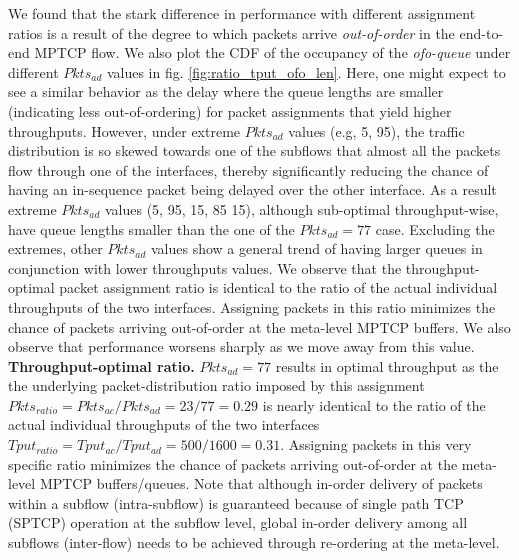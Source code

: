 We found that the stark difference in performance with different %
assignment ratios is a result of the degree to which packets arrive
\textit{out-of-order} in the end-to-end MPTCP flow. 
\fi
We also plot the CDF of the
occupancy of the \emph{ofo-queue} under different $Pkts_{ad}$
values in fig. \ref{fig:ratio_tput_ofo_len}. Here, one might expect to
see a similar behavior as the delay where the queue lengths are smaller
(indicating less out-of-ordering) for packet assignments that yield
higher throughputs. However, under extreme $Pkts_{ad}$ values
(e.g, 5, 95), the traffic distribution is so skewed towards one of
the subflows that almost all the packets flow through one of
the interfaces, thereby significantly reducing the chance of having an
in-sequence packet being delayed over the other interface. As a result
extreme $Pkts_{ad}$ values (5, 95, 15, 85 15), although sub-optimal
throughput-wise, have queue lengths smaller than the one of the $Pkts_{ad}=77$ case.
Excluding the extremes, other $Pkts_{ad}$ values show a general trend of
having larger queues in conjunction with lower throughputs values.
\fi
We observe that the throughput-optimal packet assignment ratio is
identical to the ratio of the actual individual throughputs of the two
interfaces. Assigning packets in this ratio minimizes the chance of
packets arriving out-of-order at the meta-level MPTCP buffers. We also
observe that performance worsens sharply as we move away from this
value.
\noindent\textbf{Throughput-optimal ratio.} $Pkts_{ad}=77$ results in optimal throughput as the
the underlying packet-distribution ratio imposed by this assignment
$Pkts_{ratio}=Pkts_{ac}/Pkts_{ad}=23/77=0.29$ is nearly identical to
the ratio of the actual individual throughputs of the two interfaces
$Tput_{ratio}=Tput_{ac}/Tput_{ad}=500/1600=0.31$. Assigning packets in
this very specific ratio minimizes the chance of packets arriving
out-of-order at the meta-level MPTCP buffers/queues. 
\fi
{}
Note that
although in-order delivery of packets within a subflow (intra-subflow)
is guaranteed because of single path TCP (SPTCP) operation at the subflow level,
global in-order delivery among all subflows (inter-flow) needs
to be achieved through re-ordering at the meta-level.
\fi
